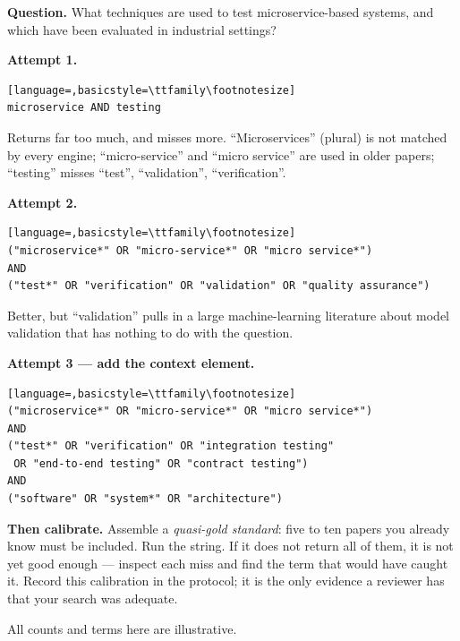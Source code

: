 \begin{worked}
\textbf{Question.} What techniques are used to test microservice-based systems,
and which have been evaluated in industrial settings?

\medskip
\textbf{Attempt 1.}
\begin{lstlisting}[language=,basicstyle=\ttfamily\footnotesize]
microservice AND testing
\end{lstlisting}
Returns far too much, and misses more. ``Microservices'' (plural) is not
matched by every engine; ``micro-service'' and ``micro service'' are used in
older papers; ``testing'' misses ``test'', ``validation'', ``verification''.

\medskip
\textbf{Attempt 2.}
\begin{lstlisting}[language=,basicstyle=\ttfamily\footnotesize]
("microservice*" OR "micro-service*" OR "micro service*")
AND
("test*" OR "verification" OR "validation" OR "quality assurance")
\end{lstlisting}
Better, but ``validation'' pulls in a large machine-learning literature about
model validation that has nothing to do with the question.

\medskip
\textbf{Attempt 3 --- add the context element.}
\begin{lstlisting}[language=,basicstyle=\ttfamily\footnotesize]
("microservice*" OR "micro-service*" OR "micro service*")
AND
("test*" OR "verification" OR "integration testing"
 OR "end-to-end testing" OR "contract testing")
AND
("software" OR "system*" OR "architecture")
\end{lstlisting}

\medskip
\textbf{Then calibrate.} Assemble a \emph{quasi-gold standard}: five to ten
papers you already know must be included. Run the string. If it does not
return all of them, it is not yet good enough --- inspect each miss and find
the term that would have caught it. Record this calibration in the protocol; it
is the only evidence a reviewer has that your search was adequate.

\medskip
All counts and terms here are illustrative.
\end{worked}

